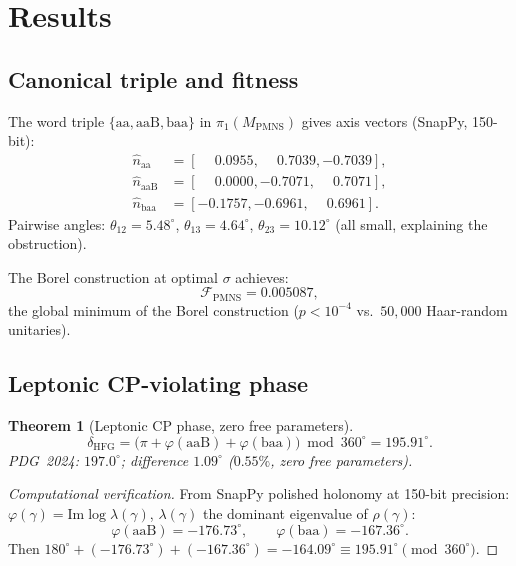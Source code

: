 \documentclass[11pt,a4paper]{article}
\newtheorem{theorem}{Theorem}
\theoremstyle{definition}
\newcommand{\MPMNS}{M_{\mathrm{PMNS}}}
\begin{document}
\section{Results}
\label{sec:results}

\subsection{Canonical triple and fitness}

The word triple $\{\mathrm{aa},\mathrm{aaB},\mathrm{baa}\}$
in $\pi_1(\MPMNS)$ gives axis vectors (SnapPy, 150-bit):
\begin{align*}
  \hat{n}_{\mathrm{aa}}  &= [\phantom{-}0.0955,\phantom{-}0.7039,-0.7039],\\
  \hat{n}_{\mathrm{aaB}} &= [\phantom{-}0.0000,-0.7071,\phantom{-}0.7071],\\
  \hat{n}_{\mathrm{baa}} &= [-0.1757,-0.6961,\phantom{-}0.6961].
\end{align*}
Pairwise angles: $\theta_{12}=5.48^\circ$, $\theta_{13}=4.64^\circ$,
$\theta_{23}=10.12^\circ$ (all small, explaining the obstruction).

The Borel construction at optimal $\sigma$ achieves:
\[
  \mathcal{F}_{\mathrm{PMNS}} = 0.005087,
\]
the global minimum of the Borel construction
($p<10^{-4}$ vs.\ $50{,}000$ Haar-random unitaries).

\subsection{Leptonic CP-violating phase}
\label{subsec:cp}

\begin{theorem}[Leptonic CP phase, zero free parameters]
\label{thm:cp}
\[
  \boxed{
    \delta_{\mathrm{HFG}}
    = \bigl(\pi + \varphi(\mathrm{aaB}) + \varphi(\mathrm{baa})\bigr)
      \bmod 360^\circ
    = 195.91^\circ.
  }
\]
PDG~2024: $197.0^\circ$; difference $1.09^\circ$ ($0.55\%$,
zero free parameters).
\end{theorem}

\begin{proof}[Computational verification]
From SnapPy polished holonomy at 150-bit precision:
$\varphi(\gamma)=\mathrm{Im}\log\lambda(\gamma)$,
$\lambda(\gamma)$ the dominant eigenvalue of $\rho(\gamma)$:
\[
  \varphi(\mathrm{aaB}) = -176.73^\circ,
  \qquad
  \varphi(\mathrm{baa}) = -167.36^\circ.
\]
Then $180^\circ + (-176.73^\circ) + (-167.36^\circ)
= -164.09^\circ \equiv 195.91^\circ \pmod{360^\circ}$.
\end{proof}
\end{document}
